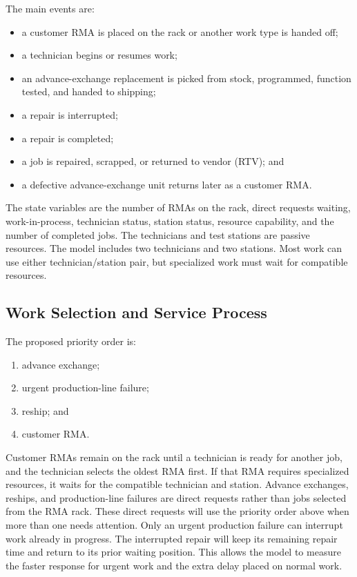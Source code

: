 \documentclass[12pt, letterpaper, twoside]{article}
\begin{document}
The main events are:

\begin{itemize}
    \item a customer RMA is placed on the rack or another work type is handed off;
    \item a technician begins or resumes work;
    \item an advance-exchange replacement is picked from stock, programmed, function
    tested, and handed to shipping;
    \item a repair is interrupted;
    \item a repair is completed;
    \item a job is repaired, scrapped, or returned to vendor (RTV); and
    \item a defective advance-exchange unit returns later as a customer RMA.
\end{itemize}

The state variables are the number of RMAs on the rack, direct requests waiting, work-in-process,
technician status, station status, resource capability, and the number of completed jobs.
The technicians and test stations are passive resources. The model includes two technicians
and two stations. Most work can use either technician/station pair, but specialized work
must wait for compatible resources.

\subsection{Work Selection and Service Process}

The proposed priority order is:

\begin{enumerate}
    \item advance exchange;
    \item urgent production-line failure;
    \item reship; and
    \item customer RMA.
\end{enumerate}

Customer RMAs remain on the rack until a technician is ready for another job, and the technician selects the oldest
RMA first. If that RMA requires specialized resources, it waits for the compatible
technician and station. Advance exchanges, reships, and production-line failures are direct
requests rather than jobs selected from the RMA rack. These direct requests will use the
priority order above when more than one needs attention. Only an urgent production failure
can interrupt work already in progress. The interrupted repair will keep its remaining
repair time and return to its prior waiting position. This allows the model to measure the
faster response for urgent work and the extra delay placed on normal work.
\end{document}
